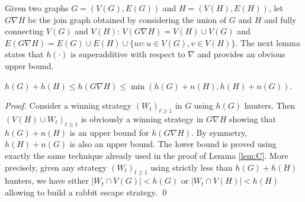 \documentclass[runningheads]{llncs}
\newcommand{\wal}[1]{\textcolor{red}{#1}}
\newcommand{\ale}[1]{\textcolor{blue}{#1}}
\begin{document}
Given two graphs $G=(V(G),E(G))$ and $H = (V(H),E(H))$, let  
$G \nabla H$ be  {the join} graph obtained by considering the union of $G$ and $H$ and fully connecting   $V(G)$ and $V(H)$: $V(G \nabla H) = V(H) \cup V(G)$ and $E (G \nabla H) = E(G) \cup E(H) \cup \{ uv: u \in V(G), v \in V(H)  \}$. The next lemma states that $h(\cdot)$ is superadditive with respect to $\nabla$ and provides  an obvious upper bound. %

\begin{lemma}
$h(G) + h(H)  \leq h(G \nabla H) \leq \min \left(h(G) + n(H), h(H) + n(G) \right)$.
\label{lem:comp}
\end{lemma}

\begin{proof}
Consider a winning strategy $(W_t)_{t \geq 1}$ in $G$ using $h(G)$ hunters. Then $(V(H) \cup W_t)_{t \ge 1}$ is obviously a winning strategy in  $G \nabla H$ showing that  $h(G) + n(H)$ is an upper bound for $h(G \nabla H)$. By symmetry, $h(H) + n(G)$ is also an upper bound.  The lower bound is proved using exactly the same technique already used in the proof of Lemma \ref{lem:C}. More precisely, given any strategy
$(W_t)_{t \geq 1}$ using strictly less than $h(G)+h(H)$ hunters, we have either $|W_t \cap V(G)| <h(G)$ or  $|W_t \cap V(H)| <h(H)$ allowing to build a rabbit escape strategy.  
\qed\end{proof}
\end{document}
